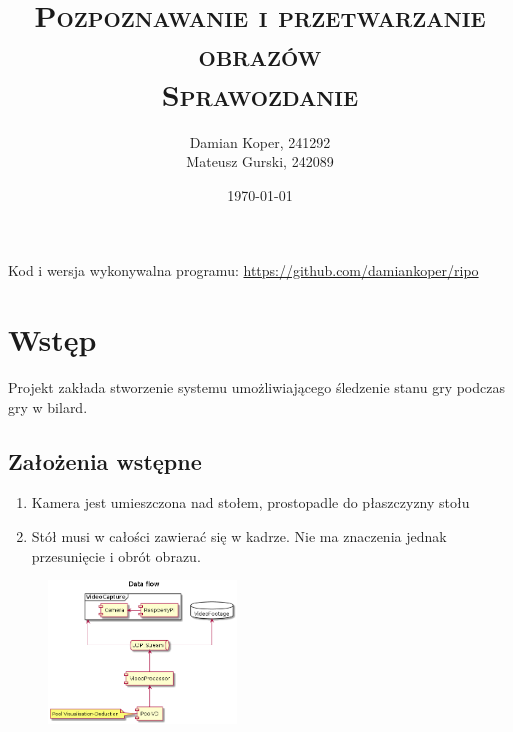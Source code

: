 \documentclass[12pt]{article}
\title{ 
    \vspace*{50mm}
    \textsc{
        \textbf{Pozpoznawanie i przetwarzanie obrazów}\\
        \large Sprawozdanie 
    }
}
\author{
Damian Koper,  241292\\
Mateusz Gurski, 242089
}
\date{\today}
\begin{document}
\maketitle

\newpage
\setcounter{tocdepth}{2}
\localtableofcontents
\listoffigures 
\lstlistoflistings
\vfill
Kod i wersja wykonywalna programu: \url{https://github.com/damiankoper/ripo}
\newpage

\section{Wstęp}
Projekt zakłada stworzenie systemu umożliwiającego śledzenie stanu gry podczas gry w bilard.


\subsection{Założenia wstępne}
\begin{enumerate}[noitemsep]
    \item Kamera jest umieszczona nad stołem, prostopadle do płaszczyzny stołu
    \item Stół musi w całości zawierać się w kadrze. Nie ma znaczenia jednak przesunięcie i obrót obrazu.
\end{enumerate}

\begin{figure}[]
    \centering
    \includegraphics[width=5cm]{./diagrams/out/Data_flow.png}
    \caption{}
    \label{}
\end{figure}
\end{document}
